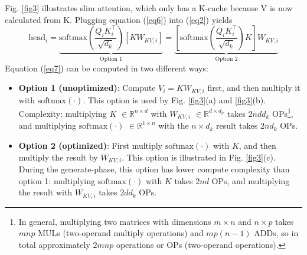 \documentclass{article}
\newcommand{\eR}[2]{$\in \mathbb{R}^{#1 \times #2}$} %
\begin{document}
Fig. \ref{fig3} illustrates slim attention, which only has a K-cache because V is now calculated from K. Plugging equation (\ref{eq6}) into (\ref{eq2}) yields
\begin{equation}
  \text{head}_i
  = \underbrace{ \text{softmax} \left( \frac{Q_i K_i^\top}{\sqrt{d_k}} \right) \left[ K W_{KV,i} \right] }_{\text{Option 1}}
  = \underbrace{ \left[ \text{softmax} \left( \frac{Q_i K_i^\top}{\sqrt{d_k}} \right) K \right] W_{KV,i} }_{\text{Option 2}}
\label{eq7} \end{equation}
Equation (\ref{eq7}) can be computed in two different ways:

\begin{itemize}[topsep=-1pt]
  \item \textbf{Option 1 (unoptimized)}: Compute $V_i = K W_{KV,i}$ first, and then multiply it with $\text{softmax}(\cdot)$. This option is used by Fig. \ref{fig3}(a) and \ref{fig3}(b). Complexity: multiplying $K$ \eR{n}{d} with $W_{KV,i}$ \eR{d}{d_k} takes $2 n d d_k$ OPs\footnote{In general, multiplying two matrices with dimensions $m \times n$ and $n \times p$ takes $mnp$ MULs (two-operand multiply operations) and $mp(n-1)$ ADDs, so in total approximately $2mnp$ operations or OPs (two-operand operations).}, and multiplying $\text{softmax}(\cdot)$ \eR{1}{n} with the $n \times d_k$ result takes $2 n d_k$ OPs.
  \item \textbf{Option 2 (optimized)}: First multiply $\text{softmax}(\cdot)$ with $K$, and then multiply the result by $W_{KV,i}$.  This option is illustrated in Fig. \ref{fig3}(c). During the generate-phase, this option has lower compute complexity than option 1: multiplying $\text{softmax}(\cdot)$ with $K$ takes $2nd$ OPs, and multiplying the result with $W_{KV,i}$ takes $2dd_k$ OPs.
\end{itemize}
\end{document}
